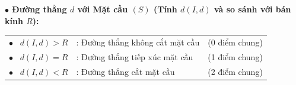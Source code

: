 \documentclass[12pt,a4paper]{article}
\begin{document}
\begin{theorybox}
    \vspace{4pt}
    \textbf{\textcolor{amberorange}{$\bullet$ Đường thẳng $d$ với Mặt cầu $(S)$ (Tính $d(I, d)$ và so sánh với bán kính $R$):}}
    \renewcommand{\arraystretch}{1.4}
    \begin{center}
    \begin{tabular}{l l l}
        $\bullet$ \ $d(I, d) > R$ & : Đường thẳng không cắt mặt cầu & (0 điểm chung) \\
        $\bullet$ \ $d(I, d) = R$ & : Đường thẳng tiếp xúc mặt cầu & (1 điểm chung) \\
        $\bullet$ \ $d(I, d) < R$ & : Đường thẳng cắt mặt cầu & (2 điểm chung) \\
    \end{tabular}
    \end{center}
\end{theorybox}

\vspace{0.25cm}
\newpage
\end{document}
